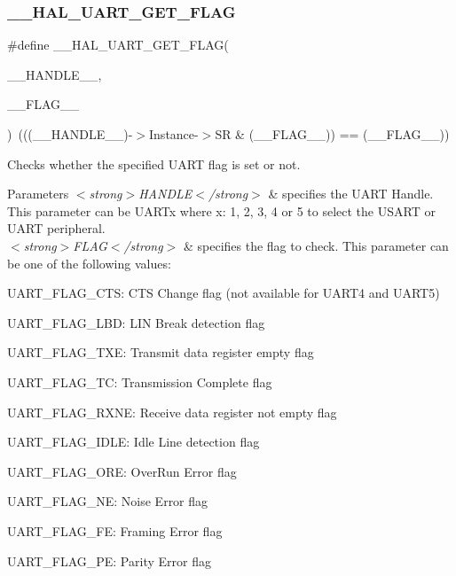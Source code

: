 \subsubsection{\texorpdfstring{\+\_\+\+\_\+\+H\+A\+L\+\_\+\+U\+A\+R\+T\+\_\+\+G\+E\+T\+\_\+\+F\+L\+AG}{\_\_HAL\_UART\_GET\_FLAG}}
{\footnotesize\ttfamily \#define \+\_\+\+\_\+\+H\+A\+L\+\_\+\+U\+A\+R\+T\+\_\+\+G\+E\+T\+\_\+\+F\+L\+AG(\begin{DoxyParamCaption}\item[{}]{\+\_\+\+\_\+\+H\+A\+N\+D\+L\+E\+\_\+\+\_\+,  }\item[{}]{\+\_\+\+\_\+\+F\+L\+A\+G\+\_\+\+\_\+ }\end{DoxyParamCaption})~(((\+\_\+\+\_\+\+H\+A\+N\+D\+L\+E\+\_\+\+\_\+)-\/$>$Instance-\/$>$SR \& (\+\_\+\+\_\+\+F\+L\+A\+G\+\_\+\+\_\+)) == (\+\_\+\+\_\+\+F\+L\+A\+G\+\_\+\+\_\+))}



Checks whether the specified U\+A\+RT flag is set or not. 


\begin{DoxyParams}{Parameters}
{\em $<$strong$>$\+H\+A\+N\+D\+L\+E$<$/strong$>$} & specifies the U\+A\+RT Handle. This parameter can be U\+A\+R\+Tx where x\+: 1, 2, 3, 4 or 5 to select the U\+S\+A\+RT or U\+A\+RT peripheral. \\
\hline
{\em $<$strong$>$\+F\+L\+A\+G$<$/strong$>$} & specifies the flag to check. This parameter can be one of the following values\+: \begin{DoxyItemize}
\item U\+A\+R\+T\+\_\+\+F\+L\+A\+G\+\_\+\+C\+TS\+: C\+TS Change flag (not available for U\+A\+R\+T4 and U\+A\+R\+T5) \item U\+A\+R\+T\+\_\+\+F\+L\+A\+G\+\_\+\+L\+BD\+: L\+IN Break detection flag \item U\+A\+R\+T\+\_\+\+F\+L\+A\+G\+\_\+\+T\+XE\+: Transmit data register empty flag \item U\+A\+R\+T\+\_\+\+F\+L\+A\+G\+\_\+\+TC\+: Transmission Complete flag \item U\+A\+R\+T\+\_\+\+F\+L\+A\+G\+\_\+\+R\+X\+NE\+: Receive data register not empty flag \item U\+A\+R\+T\+\_\+\+F\+L\+A\+G\+\_\+\+I\+D\+LE\+: Idle Line detection flag \item U\+A\+R\+T\+\_\+\+F\+L\+A\+G\+\_\+\+O\+RE\+: Over\+Run Error flag \item U\+A\+R\+T\+\_\+\+F\+L\+A\+G\+\_\+\+NE\+: Noise Error flag \item U\+A\+R\+T\+\_\+\+F\+L\+A\+G\+\_\+\+FE\+: Framing Error flag \item U\+A\+R\+T\+\_\+\+F\+L\+A\+G\+\_\+\+PE\+: Parity Error flag \end{DoxyItemize}
\\
\hline
\end{DoxyParams}

